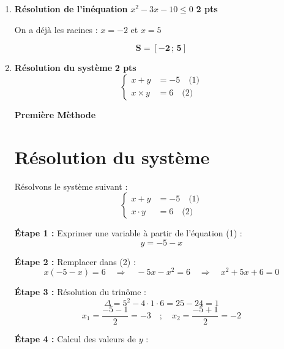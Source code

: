 \documentclass[12pt,a4paper]{article}
\begin{document}
\begin{enumerate}
    \item \textbf{Résolution de l’inéquation} \( x^2 - 3x - 10 \leq 0 \) \hfill \textbf{2 pts}

    On a déjà les racines : \( x = -2 \) et \( x = 5 \)

		
		\begin{center}

\end{center}
    \begin{resultbox}
    \[
    \mathbf{S=[-2\,;\,5]}
    \]
\end{resultbox}

    \item \textbf{Résolution du système} \hfill \textbf{2 pts}
    \[
    \left\{
    \begin{aligned}
        x + y &= -5 \quad \text{(1)}\\
        x \times y &= 6 \quad \text{(2)}
    \end{aligned}
    \right.
    \]

\begin{center}
\textbf{Première Mèthode}
\end{center}

\section*{Résolution du système}

Résolvons le système suivant :
\[
\left\{
\begin{aligned}
x + y &= -5 \quad \text{(1)}\\
x \cdot y &= 6 \quad \text{(2)}
\end{aligned}
\right.
\]

\textbf{Étape 1 :} Exprimer une variable à partir de l’équation (1) :  
\[
y = -5 - x
\]

\textbf{Étape 2 :} Remplacer dans (2) :
\[
x(-5 - x) = 6 \quad \Rightarrow \quad -5x - x^2 = 6 \quad \Rightarrow \quad x^2 + 5x + 6 = 0
\]

\textbf{Étape 3 :} Résolution du trinôme :
\[
\Delta = 5^2 - 4 \cdot 1 \cdot 6 = 25 - 24 = 1
\]
\[
x_1 = \frac{-5 - 1}{2} = -3 \quad ; \quad x_2 = \frac{-5 + 1}{2} = -2
\]

\textbf{Étape 4 :} Calcul des valeurs de \( y \) :


\end{enumerate}
\end{document}
